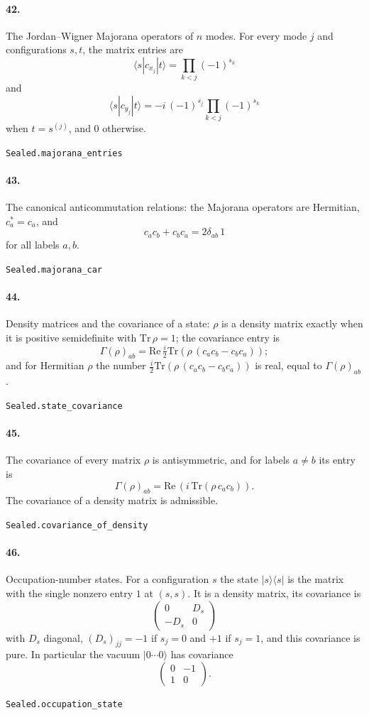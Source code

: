 \documentclass[11pt]{article}
\begin{document}
\paragraph{42.} The Jordan–Wigner Majorana operators of $n$ modes. For every mode $j$ and configurations $s, t$, the matrix entries are \[\langle s|c_{x_j}|t\rangle = \prod_{k<j}(-1)^{s_k}\] and \[\langle s|c_{y_j}|t\rangle = -i\,(-1)^{s_j}\prod_{k<j}(-1)^{s_k}\] when $t = s^{(j)}$, and $0$ otherwise.\par{\footnotesize\texttt{Sealed.majorana\_entries}}

\paragraph{43.} The canonical anticommutation relations: the Majorana operators are Hermitian, $c_a^* = c_a$, and \[c_a c_b + c_b c_a = 2\delta_{ab}\,1\] for all labels $a, b$.\par{\footnotesize\texttt{Sealed.majorana\_car}}

\paragraph{44.} Density matrices and the covariance of a state: $\rho$ is a density matrix exactly when it is positive semidefinite with $\mathrm{Tr}\,\rho = 1$; the covariance entry is \[\Gamma(\rho)_{ab} = \mathrm{Re}\,\tfrac i2 \mathrm{Tr}(\rho\,(c_a c_b - c_b c_a));\] and for Hermitian $\rho$ the number $\tfrac i2 \mathrm{Tr}(\rho\,(c_a c_b - c_b c_a))$ is real, equal to $\Gamma(\rho)_{ab}$.\par{\footnotesize\texttt{Sealed.state\_covariance}}

\paragraph{45.} The covariance of every matrix $\rho$ is antisymmetric, and for labels $a \ne b$ its entry is \[\Gamma(\rho)_{ab} = \mathrm{Re}\,(i\,\mathrm{Tr}(\rho\, c_a c_b)).\] The covariance of a density matrix is admissible.\par{\footnotesize\texttt{Sealed.covariance\_of\_density}}

\paragraph{46.} Occupation-number states. For a configuration $s$ the state $|s\rangle\langle s|$ is the matrix with the single nonzero entry $1$ at $(s, s)$. It is a density matrix, its covariance is \[\begin{pmatrix} 0 & D_s \\ -D_s & 0 \end{pmatrix}\] with $D_s$ diagonal, $(D_s)_{jj} = -1$ if $s_j = 0$ and $+1$ if $s_j = 1$, and this covariance is pure. In particular the vacuum $|0\cdots0\rangle$ has covariance \[\begin{pmatrix} 0 & -1 \\ 1 & 0 \end{pmatrix}.\]\par{\footnotesize\texttt{Sealed.occupation\_state}}
\end{document}
